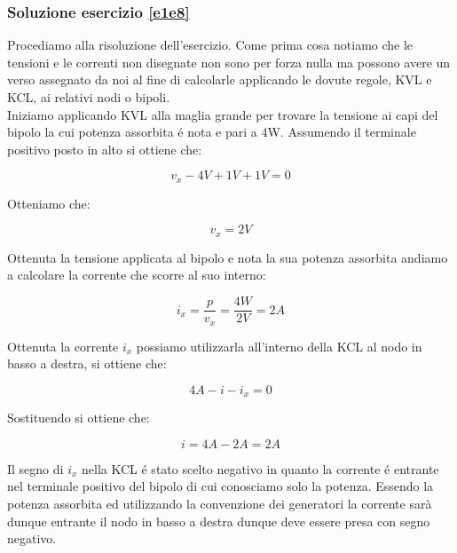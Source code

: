 \documentclass[../main.tex]{subfiles}
\begin{document}
\subsubsection*{Soluzione esercizio \ref{e1e8}}

Procediamo alla risoluzione dell'esercizio. Come prima cosa notiamo che le tensioni e le correnti non disegnate non sono per forza nulla ma possono avere un verso assegnato da noi al fine di calcolarle applicando le dovute regole, KVL e KCL, ai relativi nodi o bipoli.\\

Iniziamo applicando KVL alla maglia grande per trovare la tensione ai capi del bipolo la cui potenza assorbita é nota e pari a 4W. Assumendo il terminale positivo posto in alto si ottiene che:

\begin{equation}
	v_x - 4\unit{V} + 1\unit{V} + 1\unit{V} = 0
\end{equation}

Otteniamo che:

\begin{equation}
	v_x = 2\unit{V}
\end{equation}

Ottenuta la tensione applicata al bipolo e nota la sua potenza assorbita andiamo a calcolare la corrente che scorre al suo interno:

\begin{equation}
	i_x = \frac{p}{v_x} = \frac{4\unit{W}}{2\unit{V}} = 2\unit{A}
\end{equation}

Ottenuta la corrente $i_x$ possiamo utilizzarla all'interno della KCL al nodo in basso a destra, si ottiene che:

\begin{equation}
	4\unit{A} - i - i_x = 0
\end{equation}

Sostituendo si ottiene che:

\begin{equation}
	i = 4\unit{A} - 2\unit{A} = 2\unit{A}
\end{equation}

Il segno di $i_x$ nella KCL é stato scelto negativo in quanto la corrente é entrante nel terminale positivo del bipolo di cui conosciamo solo la potenza. Essendo la potenza assorbita ed utilizzando la convenzione dei generatori la corrente sarà dunque entrante il nodo in basso a destra dunque deve essere presa con segno negativo.\\
\end{document}
